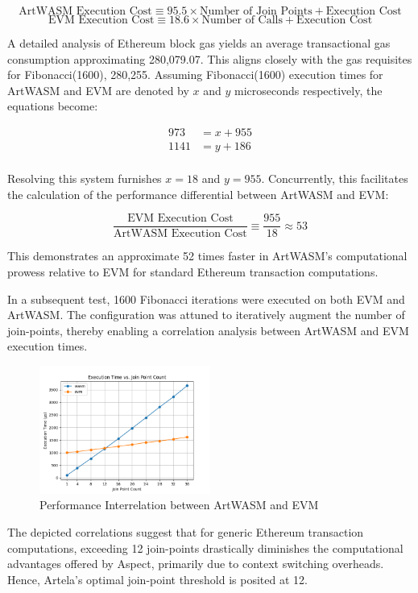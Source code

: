 \[
\text{ArtWASM Execution Cost} \equiv 95.5 \times \text{Number of Join Points} + \text{Execution Cost}
\]
\[
\text{EVM Execution Cost} \equiv 18.6 \times \text{Number of Calls} + \text{Execution Cost}
\]

A detailed analysis of Ethereum block gas yields an average transactional gas consumption approximating 280,079.07. This aligns closely with the gas requisites for Fibonacci(1600), 280,255. Assuming Fibonacci(1600) execution times for ArtWASM and EVM are denoted by \(x\) and \(y\) microseconds respectively, the equations become:

\begin{align*}
973 &= x + 955 \\
1141 &= y + 186 \\
\end{align*}

Resolving this system furnishes \(x = 18\) and \(y = 955\). Concurrently, this facilitates the calculation of the performance differential between ArtWASM and EVM:

\[
  \frac{\text{EVM Execution Cost}}{\text{ArtWASM Execution Cost}} \equiv \frac{955}{18} \approx 53
\]

This demonstrates an approximate 52 times faster in ArtWASM's computational prowess relative to EVM for standard Ethereum transaction computations.

In a subsequent test, 1600 Fibonacci iterations were executed on both EVM and ArtWASM. The configuration was attuned to iteratively augment the number of join-points, thereby enabling a correlation analysis between ArtWASM and EVM execution times.

\begin{figure}[htp]
  \centering
  \includegraphics[width=0.5\textwidth]{sections/tx-latency-et-vs-jpc.png}
  \caption{Performance Interrelation between ArtWASM and EVM}
\end{figure}

The depicted correlations suggest that for generic Ethereum transaction computations, exceeding 12 join-points drastically diminishes the computational advantages offered by Aspect, primarily due to context switching overheads. Hence, Artela's optimal join-point threshold is posited at 12.

